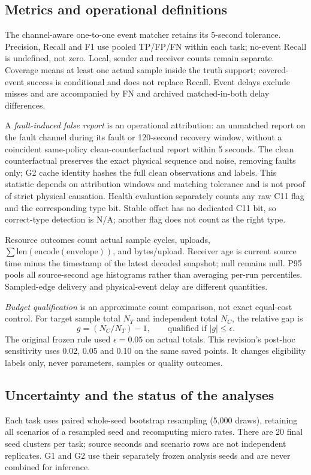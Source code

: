 \documentclass[10pt]{article}
\begin{document}
\subsection{Metrics and operational definitions}
The channel-aware one-to-one event matcher retains its 5-second tolerance. Precision, Recall and F1 use pooled TP/FP/FN within each task; no-event Recall is undefined, not zero. Local, sender and receiver counts remain separate. Coverage means at least one actual sample inside the truth support; covered-event success is conditional and does not replace Recall. Event delays exclude misses and are accompanied by FN and archived matched-in-both delay differences.

A \emph{fault-induced false report} is an operational attribution: an unmatched report on the fault channel during its fault or 120-second recovery window, without a coincident same-policy clean-counterfactual report within 5 seconds. The clean counterfactual preserves the exact physical sequence and noise, removing faults only; G2 cache identity hashes the full clean observations and labels. This statistic depends on attribution windows and matching tolerance and is not proof of strict physical causation. Health evaluation separately counts any raw C11 flag and the corresponding type bit. Stable offset has no dedicated C11 bit, so correct-type detection is N/A; another flag does not count as the right type.

Resource outcomes count actual sample cycles, uploads, $\sum\mathrm{len}(\mathrm{encode}(\mathrm{envelope}))$, and bytes/upload. Receiver age is current source time minus the timestamp of the latest decoded snapshot; null remains null. P95 pools all source-second age histograms rather than averaging per-run percentiles. Sampled-edge delivery and physical-event delay are different quantities.

\emph{Budget qualification} is an approximate count comparison, not exact equal-cost control. For target sample total $N_T$ and independent total $N_C$, the relative gap is
\begin{equation}
g=(N_C/N_T)-1,\qquad \text{qualified if } |g|\leq\epsilon.
\end{equation}
The original frozen rule used $\epsilon=0.05$ on actual totals. This revision's post-hoc sensitivity uses 0.02, 0.05 and 0.10 on the same saved points. It changes eligibility labels only, never parameters, samples or quality outcomes.

\subsection{Uncertainty and the status of the analyses}
Each task uses paired whole-seed bootstrap resampling (5,000 draws), retaining all scenarios of a resampled seed and recomputing micro rates. There are 20 final seed clusters per task; source seconds and scenario rows are not independent replicates. G1 and G2 use their separately frozen analysis seeds and are never combined for inference.
\end{document}
